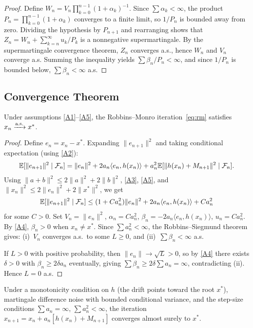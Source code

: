 \documentclass[11pt,a4paper]{article}
\begin{document}
\begin{proof}
Define $W_n = V_n \prod_{k=0}^{n-1}(1+\alpha_k)^{-1}$. Since
$\sum \alpha_k < \infty$, the product $P_n = \prod_{k=0}^{n-1}
(1+\alpha_k)$ converges to a finite limit, so $1/P_n$ is bounded
away from zero. Dividing the hypothesis by $P_{n+1}$ and
rearranging shows that $Z_n = W_n + \sum_{k=n}^{\infty}
u_k/P_k$ is a nonnegative supermartingale. By the supermartingale
convergence theorem, $Z_n$ converges a.s., hence $W_n$ and $V_n$
converge a.s. Summing the inequality yields
$\sum \beta_n/P_n < \infty$, and since $1/P_n$ is bounded below,
$\sum \beta_n < \infty$ a.s.
\end{proof}

\subsection{Convergence Theorem}

\begin{theorem}
\label{thm:rm-convergence}
Under assumptions \ref{A1}--\ref{A5}, the Robbins--Monro
iteration~\eqref{eq:rm} satisfies $x_n \xrightarrow{\text{a.s.}} x^*$.
\end{theorem}

\begin{proof}
Define $e_n = x_n - x^*$. Expanding $\|e_{n+1}\|^2$ and taking
conditional expectation (using \ref{A2}):
\[
  \mathbb{E}[\|e_{n+1}\|^2 \mid \mathcal{F}_n]
    = \|e_n\|^2 + 2a_n\langle e_n, h(x_n)\rangle
      + a_n^2\mathbb{E}[\|h(x_n) + M_{n+1}\|^2 \mid \mathcal{F}_n].
\]
Using $\|a+b\|^2 \leq 2\|a\|^2 + 2\|b\|^2$, \ref{A3}, \ref{A5},
and $\|x_n\|^2 \leq 2\|e_n\|^2 + 2\|x^*\|^2$, we get
\[
  \mathbb{E}[\|e_{n+1}\|^2 \mid \mathcal{F}_n]
    \leq (1 + Ca_n^2)\|e_n\|^2 + 2a_n\langle e_n, h(x_n)\rangle + Ca_n^2
\]
for some $C > 0$. Set $V_n = \|e_n\|^2$, $\alpha_n = Ca_n^2$,
$\beta_n = -2a_n\langle e_n, h(x_n)\rangle$, $u_n = Ca_n^2$. By
\ref{A4}, $\beta_n > 0$ when $x_n \neq x^*$. Since $\sum a_n^2 < \infty$,
the Robbins--Siegmund theorem gives: (i)~$V_n$ converges a.s.\ to
some $L \geq 0$, and (ii)~$\sum \beta_n < \infty$ a.s.

If $L > 0$ with positive probability, then $\|e_n\| \to \sqrt{L} > 0$,
so by \ref{A4} there exists $\delta > 0$ with $\beta_n \geq
2\delta a_n$ eventually, giving $\sum \beta_n \geq 2\delta\sum a_n
= \infty$, contradicting (ii). Hence $L = 0$ a.s.
\end{proof}

\begin{keyresult}[title={Robbins--Monro Convergence}]
Under a monotonicity condition on $h$ (the drift points toward the
root $x^*$), martingale difference noise with bounded conditional
variance, and the step-size conditions $\sum a_n = \infty$,
$\sum a_n^2 < \infty$, the iteration
$x_{n+1} = x_n + a_n[h(x_n) + M_{n+1}]$ converges almost surely
to $x^*$.
\end{keyresult}
\end{document}
